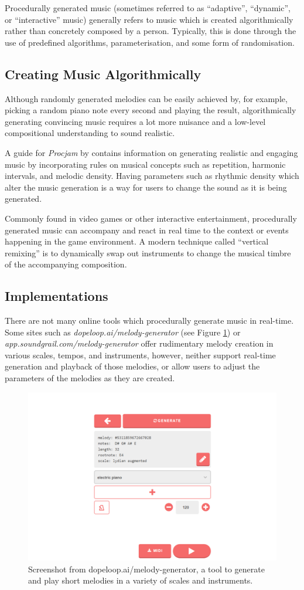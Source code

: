 Procedurally generated music (sometimes referred to as “adaptive”, “dynamic”, or “interactive” music) generally refers to music which is created algorithmically rather than concretely composed by a person. Typically, this is done through the use of predefined algorithms, parameterisation, and some form of randomisation.

\subsection{Creating Music Algorithmically}
Although randomly generated melodies can be easily achieved by, for example, picking a random piano note every second and playing the result, algorithmically generating convincing music requires a lot more nuisance and a low-level compositional understanding to sound realistic.

A guide for \textit{Procjam} by \cite{procjam} contains information on generating realistic and engaging music by incorporating rules on musical concepts such as repetition, harmonic intervals, and melodic density. Having parameters such as rhythmic density which alter the music generation is a way for users to change the sound as it is being generated.

Commonly found in video games or other interactive entertainment, procedurally generated music can accompany and react in real time to the context or events happening in the game environment. A modern technique called “vertical remixing” is to dynamically swap out instruments to change the musical timbre of the accompanying composition.

\subsection{Implementations}
There are not many online tools which procedurally generate music in real-time. Some sites such as \textit{dopeloop.ai/melody-generator} (see Figure \ref{fig:dopeloop}) or \textit{app.soundgrail.com/melody-generator} offer rudimentary melody creation in various scales, tempos, and instruments, however, neither support real-time generation and playback of those melodies, or allow users to adjust the parameters of the melodies as they are created.

\begin{figure}[htb]
    \centering
    \includegraphics[width=0.5\linewidth]{images/background/dopeloop.png}    

    \caption{Screenshot from dopeloop.ai/melody-generator, a tool to generate and play short melodies in a variety of scales and instruments.}

    \label{fig:dopeloop}

\end{figure}

